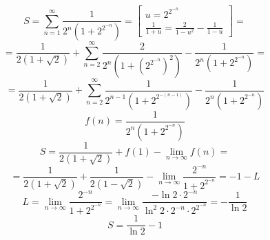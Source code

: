 


	$$S = \sum_{n = 1}^{\infty} \frac{1}{2^n (1+2^{2^{-n}})} = \left[\begin{array}{c} u =2^{2^{-n}} \\ \frac{1}{1+u} = \frac{2}{1-u^2} - \frac{1}{1-u} 
	\end{array}\right] =$$
	$$= \frac{1}{2(1+\sqrt{2})} + \sum_{n = 2}^{\infty} \frac{2}{2^n (1+(2^{2^{-n}})^2)} - \frac{1}{2^n (1+2^{2^{-n}})} = $$
	$$= \frac{1}{2(1+\sqrt{2})} + \sum_{n = 2}^{\infty} \frac{1}{2^{n-1} (1+2^{2^{-(n-1)}})} - \frac{1}{2^n (1+2^{2^{-n}})}$$
	$$f(n) = \frac{1}{2^n (1+2^{2^{-n}})}$$
	$$S= \frac{1}{2(1+\sqrt{2})} + f(1) - \lim_{n \to \infty} f(n)=$$
	$$=  \frac{1}{2(1+\sqrt{2})} + \frac{1}{2(1-\sqrt{2})}- \lim_{n \to \infty} \frac{2^{-n}}{ 1+2^{2^{-n}}} = -1-L$$
	$$L = \lim_{n \to \infty} \frac{2^{-n}}{ 1+2^{2^{-n}}} = \lim_{n \to \infty} \frac{-\ln2 \cdot 2^{-n}}{ \ln^2 2 \cdot 2^{-n} \cdot 2^{2^{-n}}} = -\frac{1}{\ln 2}$$
	$$S = \frac{1}{\ln 2} - 1$$
	
